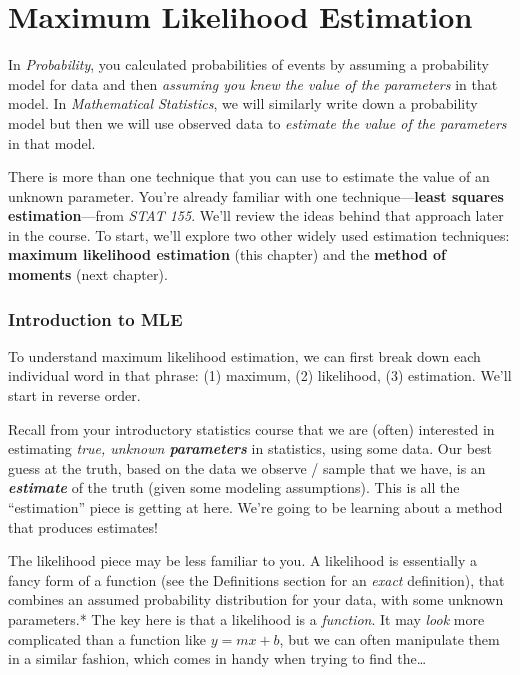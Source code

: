 \documentclass[
  letterpaper,
  DIV=11,
  numbers=noendperiod]{scrreprt}
\begin{document}

\chapter{Maximum Likelihood
Estimation}\label{maximum-likelihood-estimation}

In \emph{Probability}, you calculated probabilities of events by
assuming a probability model for data and then \emph{assuming you knew
the value of the parameters} in that model. In \emph{Mathematical
Statistics}, we will similarly write down a probability model but then
we will use observed data to \emph{estimate the value of the parameters}
in that model.

There is more than one technique that you can use to estimate the value
of an unknown parameter. You're already familiar with one
technique---\textbf{least squares estimation}---from \emph{STAT 155}.
We'll review the ideas behind that approach later in the course. To
start, we'll explore two other widely used estimation techniques:
\textbf{maximum likelihood estimation} (this chapter) and the
\textbf{method of moments} (next chapter).

\subsection*{Introduction to MLE}\label{introduction-to-mle}

To understand maximum likelihood estimation, we can first break down
each individual word in that phrase: (1) maximum, (2) likelihood, (3)
estimation. We'll start in reverse order.

Recall from your introductory statistics course that we are (often)
interested in estimating \emph{true, unknown \textbf{parameters}} in
statistics, using some data. Our best guess at the truth, based on the
data we observe / sample that we have, is an \textbf{\emph{estimate}} of
the truth (given some modeling assumptions). This is all the
``estimation'' piece is getting at here. We're going to be learning
about a method that produces estimates!

The likelihood piece may be less familiar to you. A likelihood is
essentially a fancy form of a function (see the Definitions section for
an \emph{exact} definition), that combines an assumed probability
distribution for your data, with some unknown parameters.* The key here
is that a likelihood is a \emph{function}. It may \emph{look} more
complicated than a function like \(y = mx + b\), but we can often
manipulate them in a similar fashion, which comes in handy when trying
to find the\ldots{}
\end{document}
